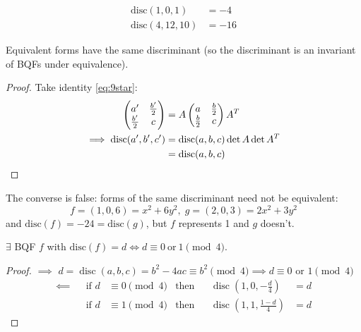 \documentclass{article}
\DeclareMathOperator{\disc}{disc}
\begin{document}
\begin{eg}
    \begin{align*}
        \mathrm{disc}(1, 0, 1) &= -4 \\
        \mathrm{disc}(4, 12, 10) &= -16
    \end{align*}
\end{eg}

\begin{nlemma}\label{lem:4.2}
    Equivalent forms have the same discriminant (so the discriminant is an invariant of BQFs under equivalence).
\end{nlemma}

\begin{proof}
    Take identity \eqref{eq:9star}:
    \begin{align*}
        \begin{pmatrix} a' & \frac{b'}{2} \\ \frac{b'}{2} & c \end{pmatrix}
        &= A \begin{pmatrix} a & \frac{b}{2} \\ \frac{b}{2} & c \end{pmatrix}
        A^T \\
        \implies \mathrm{disc}(a', b', c') &= \mathrm{disc}(a, b, c) \det A \det A^T \\
                                           &= \mathrm{disc}(a, b, c) \qedhere
    \end{align*}
\end{proof}

\begin{remark}
    The converse is false: forms of the same discriminant need not be equivalent:
    \begin{equation*}
        f = (1, 0, 6) = x^2 + 6y^2, \; g = (2, 0, 3) = 2x^2 + 3y^2
    \end{equation*}
    and $\mathrm{disc}(f) = -24 = \mathrm{disc}(g)$, but $f$ represents 1 and $g$ doesn't.
\end{remark}

\begin{nlemma}\label{lem:4.3}
    $\exists$ BQF $f$ with $\mathrm{disc}(f) = d \iff d \equiv 0 \ \text{or}\ 1 \pmod{4}$.
\end{nlemma}
\begin{proof}
    $\implies$ $d = \disc(a, b, c) = b^2 - 4ac \equiv b^2 \pmod{4} \implies d \equiv 0 \text{ or } 1 \pmod{4}$
    \begin{align*}
        \impliedby& & \text{if } d &\equiv 0 \pmod{4} & \text{then}& &\disc\left(1, 0, -\frac{d}{4}\right) &= d \\
                  & & \text{if } d &\equiv 1 \pmod{4} & \text{then}& &\disc\left(1, 1, \frac{1-d}{4}\right) &= d
    \end{align*}
\end{proof}
\end{document}

